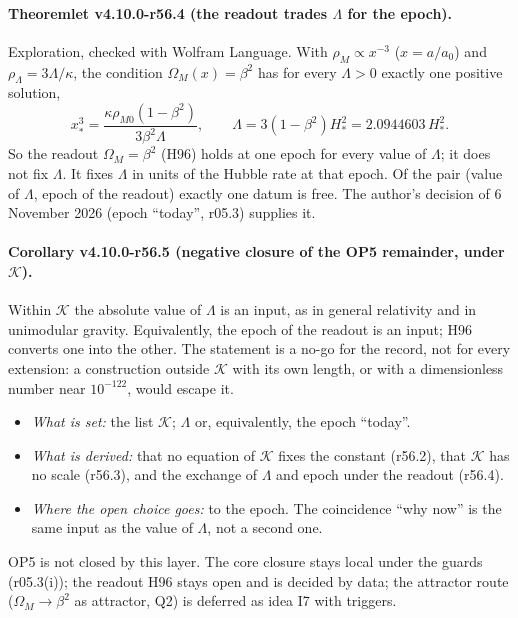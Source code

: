 \paragraph{Theoremlet v4.10.0-r56.4 (the readout trades \(\Lambda\) for the epoch).}
Exploration, checked with Wolfram Language.  With \(\rho_M\propto x^{-3}\) (\(x=a/a_0\)) and \(\rho_\Lambda=3\Lambda/\kappa\), the condition \(\Omega_M(x)=\beta^2\) has for every
\(\Lambda>0\) exactly one positive solution,
\[
x_*^3=\frac{\kappa\rho_{M0}(1-\beta^2)}{3\beta^2\Lambda},\qquad \Lambda=3(1-\beta^2)H_*^2=2.0944603\,H_*^2 .
\]
So the readout \(\Omega_M=\beta^2\) (H96) holds at one epoch for every value of \(\Lambda\); it does not fix \(\Lambda\).  It fixes \(\Lambda\) in units of the Hubble
rate at that epoch.  Of the pair (value of \(\Lambda\), epoch of the readout) exactly one datum is free.  The author's decision of 6 November 2026
(epoch ``today'', r05.3) supplies it.

\paragraph{Corollary v4.10.0-r56.5 (negative closure of the OP5 remainder, under \(\mathcal K\)).}
Within \(\mathcal K\) the absolute value of \(\Lambda\) is an input, as in general relativity and in unimodular gravity.  Equivalently, the epoch of
the readout is an input; H96 converts one into the other.  The statement is a no-go for the record, not for every extension: a construction
outside \(\mathcal K\) with its own length, or with a dimensionless number near \(10^{-122}\), would escape it.
\begin{itemize}[leftmargin=2em]
\item \emph{What is set:} the list \(\mathcal K\); \(\Lambda\) or, equivalently, the epoch ``today''.
\item \emph{What is derived:} that no equation of \(\mathcal K\) fixes the constant (r56.2), that \(\mathcal K\) has no scale (r56.3), and the exchange of
\(\Lambda\) and epoch under the readout (r56.4).
\item \emph{Where the open choice goes:} to the epoch.  The coincidence ``why now'' is the same input as the value of \(\Lambda\), not a second one.
\end{itemize}
OP5 is not closed by this layer.  The core closure stays local under the guards (r05.3(i)); the readout H96 stays open and is decided by data;
the attractor route (\(\Omega_M\to\beta^2\) as attractor, Q2) is deferred as idea I7 with triggers.

